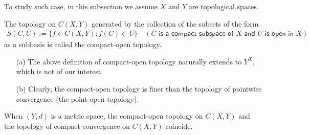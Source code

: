 To study such case, in this subsection we assume $X$ and $Y$ are topological spaces.
\begin{defi}
    The topology on $C(X, Y)$ generated by the collection of the subsets of the form
    \begin{align*}
        S(C, U):=\{f\in C(X, Y): f(C)\subset U\}
        \quad
        (\textsf{$C$ is a compact subspace of $X$ and $U$ is open in $X$})
    \end{align*}
    as a subbasis is called the compact-open topology.
\end{defi}
\begin{rmk}
    \begin{enumerate}
        \item[(a)]
        {
            The above definition of compact-open topology naturally extends to $Y^X$, which is not of our interest.
        }
        \item[(b)]
        {
            Clearly, the compact-open topology is finer than the topology of pointwise convergence (the point-open topology).
        }
    \end{enumerate}
\end{rmk}
\begin{obs}\label{compact-open and compact cnvg}
    When $(Y, d)$ is a metric space, the compact-open topology on $C(X, Y)$ and the topology of compact convergence on $C(X, Y)$ coincide.
\end{obs}
